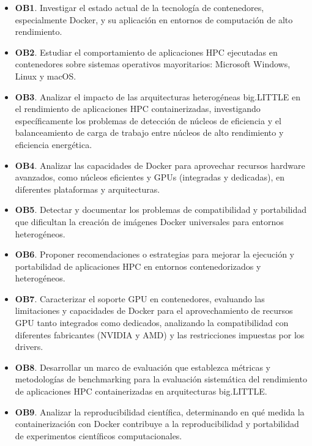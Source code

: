 \begin{itemize}
   \item \textbf{OB1}. Investigar el estado actual de la tecnología de contenedores, especialmente Docker, y su aplicación en entornos de computación de alto rendimiento.
   \item \textbf{OB2}. Estudiar el comportamiento de aplicaciones HPC ejecutadas en contenedores sobre sistemas operativos mayoritarios: Microsoft Windows, Linux y macOS.
   \item \textbf{OB3}. Analizar el impacto de las arquitecturas heterogéneas big.LITTLE en el rendimiento de aplicaciones HPC containerizadas, investigando específicamente los problemas de detección de núcleos de eficiencia y el balanceamiento de carga de trabajo entre núcleos de alto rendimiento y eficiencia energética.
   \item \textbf{OB4}. Analizar las capacidades de Docker para aprovechar recursos hardware avanzados, como núcleos eficientes y GPUs (integradas y dedicadas), en diferentes plataformas y arquitecturas.
   \item \textbf{OB5}. Detectar y documentar los problemas de compatibilidad y portabilidad que dificultan la creación de imágenes Docker universales para entornos heterogéneos.
   \item \textbf{OB6}. Proponer recomendaciones o estrategias para mejorar la ejecución y portabilidad de aplicaciones HPC en entornos contenedorizados y heterogéneos.
   \item \textbf{OB7}. Caracterizar el soporte GPU en contenedores, evaluando las limitaciones y capacidades de Docker para el aprovechamiento de recursos GPU tanto integrados como dedicados, analizando la compatibilidad con diferentes fabricantes (NVIDIA y AMD) y las restricciones impuestas por los drivers.
   \item \textbf{OB8}. Desarrollar un marco de evaluación que establezca métricas y metodologías de benchmarking para la evaluación sistemática del rendimiento de aplicaciones HPC containerizadas en arquitecturas big.LITTLE.
   \item \textbf{OB9}. Analizar la reproducibilidad científica, determinando en qué medida la containerización con Docker contribuye a la reproducibilidad y portabilidad de experimentos científicos computacionales.
\end{itemize}

